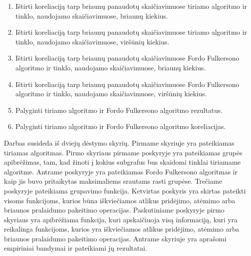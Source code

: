 \begin{enumerate}
\begin{enumerate}
			\item Ištirti koreliaciją tarp briaunų panaudotų skaičiavimuose tiriamo algoritmo ir tinklo, naudojamo skaičiavimuose, briaunų kiekius. 
			\item Ištirti koreliaciją tarp briaunų panaudotų skaičiavimuose tiriamo algoritmo ir tinklo, naudojamo skaičiavimuose, viršūnių kiekius. 
			\item Ištirti koreliaciją tarp briaunų panaudotų skaičiavimuose Fordo Fulkersono algoritmo ir tinklo, naudojamo skaičiavimuose, briaunų kiekius. 
			\item Ištirti koreliaciją tarp briaunų panaudotų skaičiavimuose Fordo Fulkersono algoritmo ir tinklo, naudojamo skaičiavimuose, viršūnių kiekius. 
			\item Palyginti tiriamo algoritmo ir Fordo Fulkersono algoritmo rezultatus.
			\item Palyginti tiriamo algoritmo ir Fordo Fulkersono algoritmo koreliacijas.
	\end{enumerate}
\end{enumerate}

Darbas susideda iš dviejų dėstymo skyrių. Pirmame skyriuje yra pateikiamas tiriamas algoritmas. Pirmo skyriaus pirmame poskyryje yra pateikiamas grupės apibrėžimas, tam, kad žinoti į kokius subgrafus bus skaidomi tinklai tiriamame algoritme. Antrame poskyryje yra pateikiamas Fordo Fulkersono algoritmas ir kaip jis buvo pritaikytas maksimaliems srautams rasti grupėse. Trečiame poskyryje pateikiama grupavimo funkcija. Ketvirtas poskyris yra skirtas pateikti visoms funkcijoms, kurios būna iškviečiamos  atlikus pridėjimo, atėmimo arba briaunos pralaidumo pakeitimo operacijas. Paskutiniame poskyryje pirmo skyriaus yra apibrėžiama funkcija, kuri apskaičiuoja visą informaciją, kuri yra  reikalinga funkcijoms, kurios yra iškviečiamos atlikus pridėjimo, atėmimo arba briaunos pralaidumo pakeitimo operacijas. Antrame skyriuje yra aprašomi empiriniai bandymai ir pateikiami jų rezultatai.